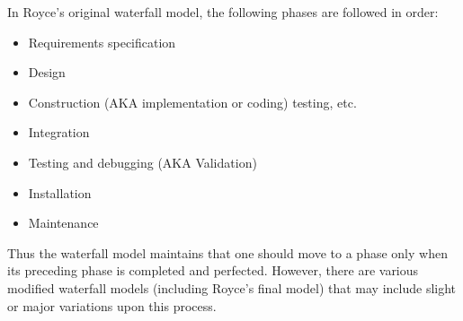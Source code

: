 	In Royce's original waterfall model, the following phases are followed in order:
	
	\begin{itemize}
		\item Requirements specification
		\item Design
		\item Construction (AKA implementation or coding) testing, etc.
		\item Integration
		\item Testing and debugging (AKA Validation)
		\item Installation
		\item Maintenance
	\end{itemize}
	
	Thus the waterfall model maintains that one should move to a phase only when its preceding phase is completed and perfected. However, there are various modified waterfall models (including Royce's final model) that may include slight or major variations upon this process.